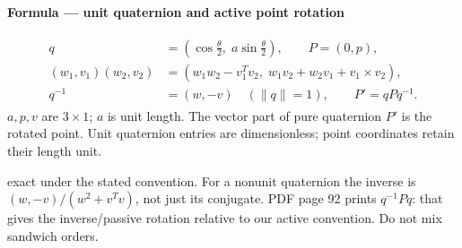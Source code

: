 \documentclass[letterpaper,11pt,english,openany,oneside]{jupyterBook}
\begin{document}
\begin{TextbookBox}
\textbf{Formula — unit quaternion and active point rotation}\par\smallskip
\begin{equation}\label{equation:lectures/lecture01/rotations:eq-lec01-quaternion}
\begin{split}\begin{aligned}
q&=\left(\cos\frac\theta2,\;a\sin\frac\theta2\right),\qquad P=(0,p),\\
(w_1,v_1)(w_2,v_2)&=(w_1w_2-v_1^Tv_2,\;w_1v_2+w_2v_1+v_1\times v_2),\\
q^{-1}&=(w,-v)\quad(\|q\|=1),\qquad P'=qPq^{-1}.
\end{aligned}\end{split}
\end{equation}
\sphinxAtStartPar
\(a,p,v\) are \(3\times1\); \(a\) is unit length. The vector part of pure quaternion \(P'\) is the rotated point. Unit quaternion entries are dimensionless; point coordinates retain their length unit.

\sphinxAtStartPar
{} exact under the stated convention. For a nonunit quaternion the inverse is \((w,-v)/(w^2+v^Tv)\), not just its conjugate. PDF page 92 prints \(q^{-1}Pq\): that gives the inverse/passive rotation relative to our active convention. Do not mix sandwich orders.

\end{TextbookBox}
\end{document}
